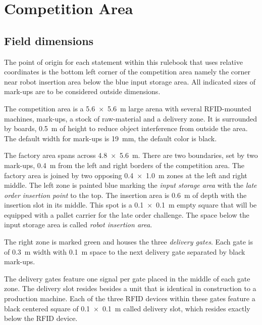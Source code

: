 \documentclass[12pt,twoside]{article}
\begin{document}


\section{Competition Area} \label{sec:area}


\subsection{Field dimensions}
\label{sec:competition-area}
The point of origin for each statement within this rulebook that uses
relative coordinates is the bottom left corner of the competition area
namely the corner near robot insertion area below the blue input
storage area. All indicated sizes of mark-ups are to be considered
outside dimensions.

The competition area is a \SI{5.6 x 5.6}{\metre} large arena with
several RFID-mounted machines, mark-ups, a stock of raw-material and a
delivery zone. It is surrounded by boards, \SI{0.5}{\metre} of height
to reduce object interference from outside the area. The default width
for mark-ups is \SI{19}{\milli\metre}, the default color is black.

The factory area spans across \SI{4.8 x 5.6}{\metre}. There are two
boundaries, set by two mark-ups, \SI{0.4}{\metre} from the left and
right borders of the competition area. The factory area is joined by
two opposing \SI{0.4 x 1.0}{\metre} zones at the left and right
middle. The left zone is painted blue marking the \textit{input
  storage area} with the \textit{late order insertion point} to the
top. The insertion area is \SI{0.6}{\metre} of depth with the
insertion slot in its middle. This spot is a \SI{0.1 x 0.1}{\metre}
empty square that will be equipped with a pallet carrier for the late
order challenge. The space below the input storage area is called
\textit{robot insertion area}.

The right zone is marked green and houses the three \textit{delivery
  gates}.  Each gate is of \SI{0.3}{\metre} width with
\SI{0.1}{\metre} space to the next delivery gate separated by black
mark-ups.

The delivery gates feature one signal per gate placed in the middle of
each gate zone. The delivery slot resides besides a unit that is
identical in construction to a production machine. Each of the three
RFID devices within these gates feature a black centered square of
\SI{0.1 x 0.1}{\metre} called delivery slot, which resides exactly
below the RFID device.
\end{document}
